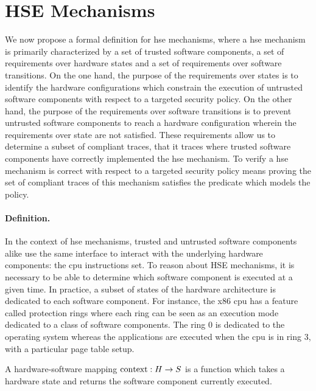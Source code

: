 \section{HSE Mechanisms}
\label{sec:speccert:hse}

We now propose a formal definition for \ac{hse} mechanisms, where a \ac{hse}
mechanism is primarily characterized by a set of trusted software components, a
set of requirements over hardware states and a set of requirements over software
transitions.
%
On the one hand, the purpose of the requirements over states is to identify the
hardware configurations which constrain the execution of untrusted software
components with respect to a targeted security policy.
%
On the other hand, the purpose of the requirements over software transitions is
to prevent untrusted software components to reach a hardware configuration
wherein the requirements over state are not satisfied.
%
These requirements allow us to determine a subset of compliant traces, that it
traces where trusted software components have correctly implemented the \ac{hse}
mechanism.
%
To verify a \ac{hse} mechanism is correct with respect to a targeted security
policy means proving the set of compliant traces of this mechanism satisfies the
predicate which models the policy.

\paragraph{Definition.}
%
In the context of \ac{hse} mechanisms, trusted and untrusted software components
alike use the same interface to interact with the underlying hardware
components: the \ac{cpu} instructions set.
%
To reason about HSE mechanisms, it is necessary to be able to determine which
software component is executed at a given time.
%
In practice, a subset of states of the hardware architecture is dedicated to
each software component.
%
For instance, the x86 \ac{cpu} has a feature called protection rings where each
ring can be seen as an execution mode dedicated to a class of software
components.
%
The ring 0 is dedicated to the operating system whereas the applications are
executed when the \ac{cpu} is in ring 3, with a particular page table setup.

\begin{definition}
  \label{def:speccert:hardsoft}
  A hardware-software mapping $\mathrm{con\-text} : H \rightarrow S$ is a function
  which takes a hardware state and returns the software component currently
  executed.
\end{definition}


